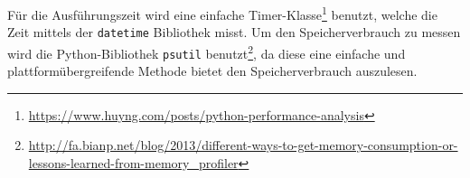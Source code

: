 Für die Ausführungszeit wird eine einfache Timer-Klasse\footnote{\url{https://www.huyng.com/posts/python-performance-analysis}} benutzt, welche die Zeit mittels der \verb|datetime| Bibliothek misst. Um den Speicherverbrauch zu messen wird die Python-Bibliothek \verb|psutil| benutzt\footnote{\url{http://fa.bianp.net/blog/2013/different-ways-to-get-memory-consumption-or-lessons-learned-from-memory_profiler}}, da diese eine einfache und plattformübergreifende Methode bietet den Speicherverbrauch auszulesen.
